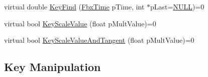 \begin{DoxyCompactItemize}
\item 
virtual double \hyperlink{class_fbx_anim_curve_a19b276335ead40663ccf4c16d6ff5e27}{Key\+Find} (\hyperlink{class_fbx_time}{Fbx\+Time} p\+Time, int $\ast$p\+Last=\hyperlink{fbxarch_8h_a070d2ce7b6bb7e5c05602aa8c308d0c4}{N\+U\+LL})=0
\item 
virtual bool \hyperlink{class_fbx_anim_curve_a5422351a86bda5b21e6ed5ce6658477e}{Key\+Scale\+Value} (float p\+Mult\+Value)=0
\item 
virtual bool \hyperlink{class_fbx_anim_curve_a2f09fd7ebeb68f8aa34f53926daf538b}{Key\+Scale\+Value\+And\+Tangent} (float p\+Mult\+Value)=0
\end{DoxyCompactItemize}
\subsection*{Key Manipulation}
